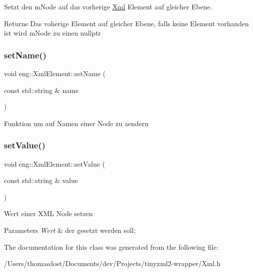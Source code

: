 Setzt den m\+Node auf das vorherige \hyperlink{classeng_1_1_xml}{Xml} Element auf gleicher Ebene. \begin{DoxyReturn}{Returns}
Das voherige Element auf gleicher Ebene, falls keine Element vorhanden ist wird m\+Node zu einen nullptr 
\end{DoxyReturn}
\mbox{\label{classeng_1_1_xml_element_afaf40a52510d1d5b443ebb0c2938a552}} 
\subsubsection{\texorpdfstring{set\+Name()}{setName()}}
{\footnotesize\ttfamily void eng\+::\+Xml\+Element\+::set\+Name (\begin{DoxyParamCaption}\item[{const std\+::string \&}]{name }\end{DoxyParamCaption})\hspace{0.3cm}{\ttfamily [inline]}}

Funktion um auf Namen einer Node zu aendern \mbox{\label{classeng_1_1_xml_element_aecffb2d9c194c2fbb87213176cefda0b}} 
\subsubsection{\texorpdfstring{set\+Value()}{setValue()}}
{\footnotesize\ttfamily void eng\+::\+Xml\+Element\+::set\+Value (\begin{DoxyParamCaption}\item[{const std\+::string \&}]{value }\end{DoxyParamCaption})\hspace{0.3cm}{\ttfamily [inline]}}

Wert einer X\+ML Node setzen 
\begin{DoxyParams}{Parameters}
{\em Wert} & der gesetzt werden soll; \\
\hline
\end{DoxyParams}


The documentation for this class was generated from the following file\+:\begin{DoxyCompactItemize}
\item 
/\+Users/thomasdost/\+Documents/dev/\+Projects/tinyxml2-\/wrapper/Xml.\+h\end{DoxyCompactItemize}
